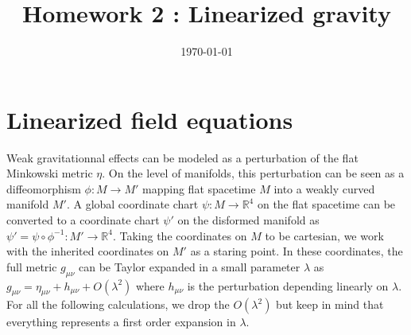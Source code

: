 \documentclass[10pt, a4paper]{article}
\title{Homework 2 : Linearized gravity
} %
\author{\PA} %
\date{\today} %
\begin{document}
\maketitlepage

\maketableofcontents


\section{Linearized field equations}
\footnotesize{
Weak gravitationnal effects can be modeled as a perturbation of the flat Minkowski metric $\eta$. On the level of manifolds, this perturbation can be seen as a diffeomorphism $\phi : M \to M'$ mapping flat spacetime $M$ into a weakly curved manifold $M'$. A global coordinate chart $\psi : M \to \mathbb{R}^4$ on the flat spacetime can be converted to a coordinate chart $\psi'$ on the disformed manifold as $\psi' = \psi \circ \phi^{-1} : M' \to \mathbb{R}^4$. Taking the coordinates on $M$ to be cartesian, we work with the inherited coordinates on $M'$ as a staring point. In these coordinates, the full metric $g_{\mu\nu}$ can be Taylor expanded in a small parameter $\lambda$ as $g_{\mu\nu} = \eta_{\mu \nu} + h_{\mu \nu} + O(\lambda^2)$ where $h_{\mu \nu}$ is the perturbation depending linearly on $\lambda$. For all the following calculations, we drop the $O(\lambda^2)$ but keep in mind that everything represents a first order expansion in $\lambda$.

}
\end{document}
